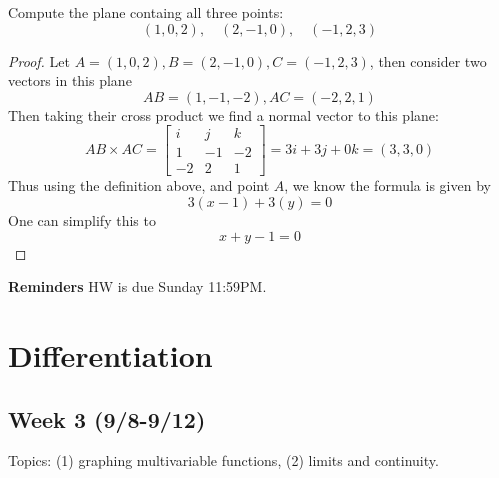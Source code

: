\documentclass[openany]{book}
\begin{document}
\begin{prob}
    Compute the plane containg all three points:
    \begin{equation*}
        (1,0,2), \quad (2, -1, 0), \quad (-1, 2, 3)
    \end{equation*}
\end{prob}
\begin{proof}
    Let $A=(1,0,2), B=(2, -1, 0), C=(-1, 2, 3)$, then consider two vectors in this plane 
    \begin{equation*}
        AB=(1,-1,-2), AC=(-2,2,1)
    \end{equation*}
    Then taking their cross product we find a normal vector to this plane:
    \begin{equation*}
        AB\times AC=\begin{bmatrix}
            i&j&k\\
            1&-1&-2\\
            -2&2&1
        \end{bmatrix}=3i+3j+0k=(3,3,0)
    \end{equation*}
    Thus using the definition above, and point $A$, we know the formula is given by 
    \begin{equation*}
        3(x-1)+3(y)=0
    \end{equation*}
    One can simplify this to 
    \begin{equation*}
        x+y-1=0
    \end{equation*}
\end{proof}

\noindent
\textbf{Reminders}
HW is due Sunday 11:59PM.






\chapter{Differentiation}
\section*{\centering Week 3 (9/8-9/12)}

\renewcommand\thesection{\arabic{section}}

\noindent
Topics: (1) graphing multivariable functions, (2) limits and continuity.
\end{document}
